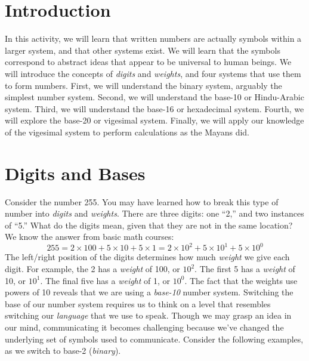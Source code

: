 \documentclass[12pt]{article}
\begin{document}
\maketitle

\section{Introduction}

In this activity, we will learn that written numbers are actually symbols within a larger system, and that other systems exist.  We will learn that the symbols correspond to abstract ideas that appear to be universal to human beings.  We will introduce the concepts of \textit{digits} and \textit{weights}, and four systems that use them to form numbers.  First, we will understand the binary system, arguably the simplest number system.  Second, we will understand the base-10 or Hindu-Arabic system.  Third, we will understand the base-16 or hexadecimal system.  Fourth, we will explore the base-20 or vigesimal system.  Finally, we will apply our knowledge of the vigesimal system to perform calculations as the Mayans did.

\section{Digits and Bases}

Consider the number 255.  You may have learned how to break this type of number into \textit{digits} and \textit{weights}.  There are three digits: one ``2,'' and two instances of ``5.''  What do the digits mean, given that they are not in the same location?  We know the answer from basic math courses:
\begin{equation}
255 = 2\times 100 + 5\times 10 + 5\times 1 = 2\times 10^2 + 5\times 10^1 + 5\times 10^0
\end{equation}
The left/right position of the digits determines how much \textit{weight} we give each digit.  For example, the 2 has a \textit{weight} of 100, or $10^2$.  The first 5 has a \textit{weight} of 10, or $10^1$.  The final five has a \textit{weight} of 1, or $10^0$.  The fact that the weights use powers of 10 reveals that we are using a \textit{base-10} number system.  Switching the base of our number system requires us to think on a level that resembles switching our \textit{language} that we use to speak.  Though we may grasp an idea in our mind, communicating it becomes challenging because we've changed the underlying set of symbols used to communicate.  Consider the following examples, as we switch to base-2 (\textit{binary}).
\end{document}
